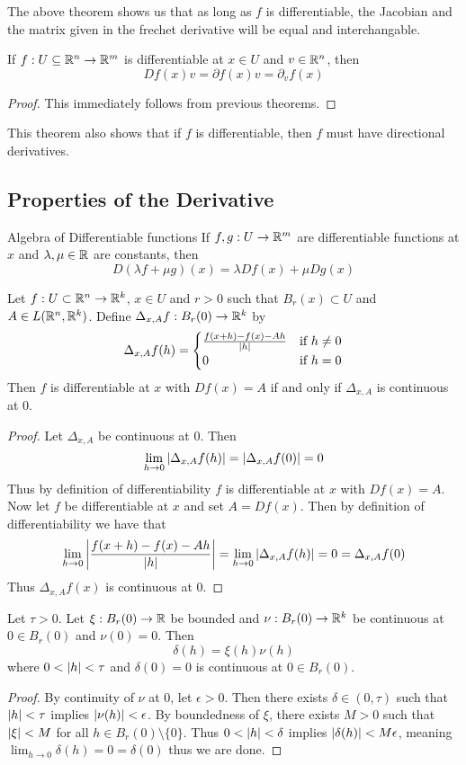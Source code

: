 \documentclass[a4paper]{article}
\begin{document}
The above theorem shows us that as long as $f$ is differentiable, the Jacobian and the matrix given in the frechet derivative will be equal and interchangable. 

\begin{lmm}{}{} If $f:U\subseteq\mathbb{R}^n\to\mathbb{R}^m$ is differentiable at $x\in U$ and $v\in\mathbb{R}^n$, then $$Df(x)v=\partial f(x)v=\partial_vf(x)$$ 
\begin{proof}
This immediately follows from previous theorems. 
\end{proof}
\end{lmm}

This theorem also shows that if $f$ is differentiable, then $f$ must have directional derivatives. 

\subsection{Properties of the Derivative}
\begin{thm}{Algebra of Differentiable functions}{} If $f,g:U\to\mathbb{R}^m$ are differentiable functions at $x $ and $\lambda,\mu\in\mathbb{R}$ are constants, then $$D(\lambda f+\mu g)(x )=\lambda Df(x )+\mu Dg(x )$$
\end{thm}

\begin{lmm}{}{} Let $f:U\subset\mathbb{R}^n\to\mathbb{R}^k$, $x\in U$ and $r>0$ such that $B_r(x)\subset U$ and $A\in L(\mathbb{R}^n,\mathbb{R}^k)$. Define $\Delta_{x,A}f:B_r(0)\to\mathbb{R}^k$ by $$\Delta_{x,A}f(h)=\begin{cases}
\frac{f(x+h)-f(x)-Ah}{\abs{h}} & \text{if $h\neq0$}\\
0 & \text{if $h=0$}
\end{cases}$$
Then $f$ is differentiable at $x$ with $Df(x)=A$ if and only if $\Delta_{x,A}$ is continuous at $0$. 
\begin{proof}
Let $\Delta_{x,A}$ be continuous at $0$. Then $$\lim_{h\to 0}\abs{\Delta_{x,A}f(h)}=\abs{\Delta_{x,A}f(0)}=0$$ Thus by definition of differentiability $f$ is differentiable at $x$ with $Df(x)=A$. \\
Now let $f$ be differentiable at $x$ and set $A=Df(x)$. Then by definition of differentiability we have that $$\lim_{h\to 0}\abs{\frac{f(x+h)-f(x)-Ah}{\abs{h}}}=\lim_{h\to 0}\abs{\Delta_{x,A}f(h)}=0=\Delta_{x,A}f(0)$$ Thus $\Delta_{x,A}f(x)$ is continuous at $0$. 
\end{proof}
\end{lmm}

\begin{lmm}{}{} Let $\tau>0$. Let $\xi:B_r(0)\to\mathbb{R}$ be bounded and $\nu:B_r(0)\to\mathbb{R}^k$ be continuous at $0\in B_r(0)$ and $\nu(0)=0$. Then $$\delta(h)=\xi(h)\nu(h)$$ where $0<\abs{h}<\tau$ and $\delta(0)=0$ is continuous at $0\in B_r(0)$. 
\begin{proof}
By continuity of $\nu$ at $0$, let $\epsilon>0$. Then there exists $\delta\in(0,\tau)$ such that $\abs{h}<\tau$ implies $\abs{\nu(h)}<\epsilon$. By boundedness of $\xi$, there exists $M>0$ such that $\abs{\xi}<M$ for all $h\in B_r(0)\setminus\{0\}$. Thus $0<\abs{h}<\delta$ implies $\abs{\delta(h)}<M\epsilon$, meaning $\lim_{h\to 0}\delta(h)=0=\delta(0)$ thus we are done. 
\end{proof}
\end{lmm}
\end{document}

